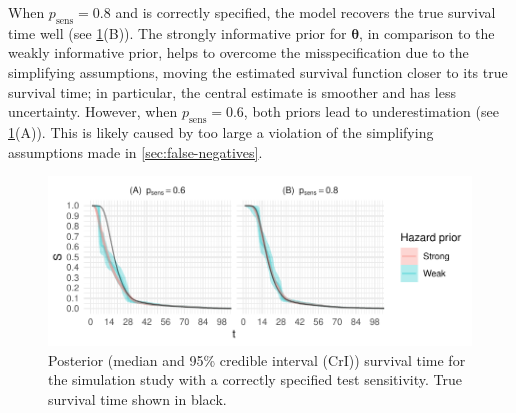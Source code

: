 \documentclass[12pt]{article}
\renewcommand{\vec}[1]{\bm{#1}}
\newcommand{\psens}{p_\text{sens}}
\begin{document}
When $\psens = 0.8$ and is correctly specified, the model recovers the true survival time well (see \cref{imperf-test:fig:constant-test-sensitivity}(B)).
The strongly informative prior for $\vec\theta$, in comparison to the weakly informative prior, helps to overcome the misspecification due to the simplifying assumptions, moving the estimated survival function closer to its true survival time; in particular, the central estimate is smoother and has less uncertainty.
However, when $\psens = 0.6$, both priors lead to underestimation (see \cref{imperf-test:fig:constant-test-sensitivity}(A)).
This is likely caused by too large a violation of the simplifying assumptions made in \cref{sec:false-negatives}.
\begin{figure}
  \includegraphics[width=\textwidth]{figures/output/sim-constant-sensitivity}
  \caption[Simulation study results with constant test sensitivity]{%
    Posterior (median and 95\% credible interval (CrI)) survival time for the simulation study with a correctly specified test sensitivity.
    True survival time shown in black.
  }
  \label{imperf-test:fig:constant-test-sensitivity}
\end{figure}
\end{document}
